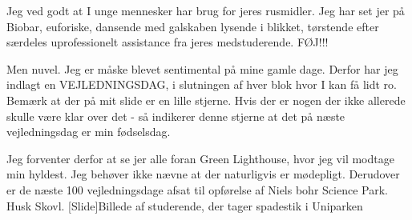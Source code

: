 \documentclass[a4paper,12pt]{article}
\begin{document}
\begin{sketch}
Jeg ved godt at I unge mennesker har brug for jeres rusmidler. Jeg har set jer på Biobar, euforiske, dansende med galskaben lysende i blikket, tørstende efter særdeles uprofessionelt assistance fra jeres medstuderende. FØJ!!!

Men nuvel. Jeg er måske blevet sentimental på mine gamle dage. Derfor har jeg indlagt en VEJLEDNINGSDAG, i slutningen af hver blok hvor I kan få lidt ro. 
Bemærk at der på mit slide er en lille stjerne.
Hvis der er nogen der ikke allerede skulle være klar over det - så indikerer denne stjerne at det på næste vejledningsdag er min fødselsdag.

Jeg forventer derfor at se jer alle foran Green Lighthouse, hvor jeg vil modtage min hyldest. Jeg behøver ikke nævne at der naturligvis er mødepligt.
Derudover er de næste 100 vejledningsdage afsat til opførelse af Niels bohr Science Park. Husk Skovl.
[Slide]Billede af studerende, der tager spadestik i Uniparken



\end{sketch}
\end{document}
